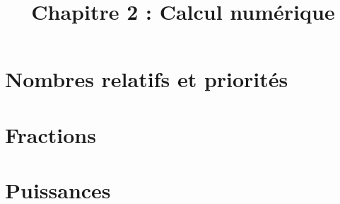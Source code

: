 \title{\vspace{-2em}Chapitre 2 : Calcul numérique\vspace{-3em}}%
\date{ }
\maketitle



\section{Nombres relatifs et priorités}



\section{Fractions}



\section{Puissances}

